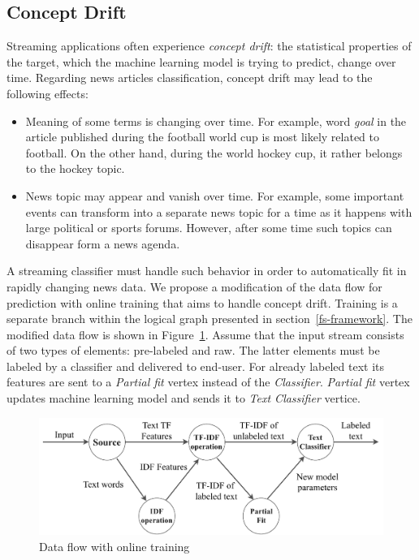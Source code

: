 \subsection{Concept Drift}

Streaming applications often experience {\em concept drift}: the statistical properties of the target, which the machine learning model is trying to predict, change over time. Regarding news articles classification, concept drift may lead to the following effects:

\begin{itemize}
    \item Meaning of some terms is changing over time. For example, word {\em goal} in the article published during the football world cup is most likely related to football. On the other hand, during the world hockey cup, it rather belongs to the hockey topic.
    \item News topic may appear and vanish over time. For example, some important events can transform into a separate news topic for a time as it happens with large political or sports forums. However, after some time such topics can disappear form a news agenda.
\end{itemize}

A streaming classifier must handle such behavior in order to automatically fit in rapidly changing news data. We propose a modification of the data flow for prediction with online training that aims to handle concept drift. Training is a separate branch within the logical graph presented in section~\ref{fs-framework}. The modified data flow is shown in Figure~\ref{training_graph}. Assume that the input stream consists of two types of elements: pre-labeled and raw. The latter elements must be labeled by a classifier and delivered to end-user. For already labeled text its features are sent to a {\em Partial fit} vertex instead of the {\em Classifier}. {\em Partial fit} vertex updates machine learning model and sends it to {\em Text Classifier} vertice.

\begin{figure}[htbp]
  \centering
  \includegraphics[scale=0.44]{pics/logical-graph}
  \caption{Data flow with online training}
  \label {training_graph}
\end{figure}

